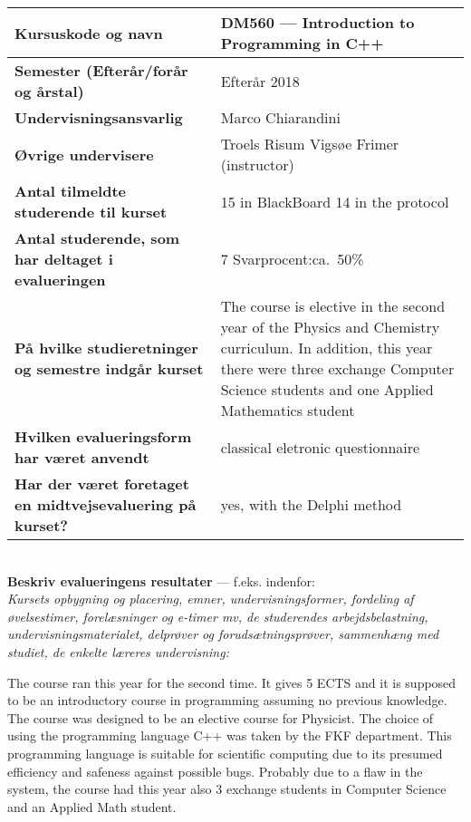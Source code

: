 \documentclass[11pt]{article}
\begin{document}
\tabulinesep=1.2mm
\begin{tabu} to 1.0 \hline
Kursuskode og navn &  DM560 --- Introduction to Programming in C++ \\\hline
Semester {\normalfont (Efterår/forår og årstal)} & Efterår 2018 \\\hline
Undervisnings\-ansvarlig &  Marco Chiarandini \\\hline
Øvrige undervisere &  Troels Risum Vigs{\o}e Frimer (instructor) \\\hline
Antal tilmeldte studerende til kurset & 15 in BlackBoard 14 in the protocol \\\hline
Antal studerende, som har deltaget i evalueringen &  7  \hfill
Svarprocent:ca.~50\% \\\hline
På hvilke studieretninger og semestre indgår kurset &  The course is elective in the second year of the Physics and Chemistry curriculum. In addition, this year there were three exchange Computer Science students and one Applied Mathematics student \\\hline
Hvilken evalueringsform har været anvendt &  classical eletronic questionnaire \\\hline
Har der været foretaget en midtvejsevaluering på kurset? &  yes, with the Delphi method  \\ 
\hline
\end{tabu}

~\\[1cm]\textcolor{sdublue}{{\bf Beskriv evalueringens resultater} ---
  f.eks. indenfor:\\ {\small \em Kursets opbygning og placering,
    emner, undervisningsformer, fordeling af øvelsestimer,
    forelæsninger og e-timer mv, de studerendes arbejdsbelastning,
    undervisningsmaterialet, delprøver og forudsætningsprøver,
    sammenhæng med studiet, de enkelte læreres undervisning:}}



The course ran this year for the second time. It gives 5 ECTS and it is
supposed to be an introductory course in programming assuming no
previous knowledge. The course was designed to be an elective course for
Physicist. The choice of using the programming language C++ was taken by
the FKF department. This programming language is suitable for scientific
computing due to its presumed efficiency and safeness against possible
bugs. Probably due to a flaw in the system, the course had this year
also 3 exchange students in Computer Science and an Applied Math
student.
\end{document}

